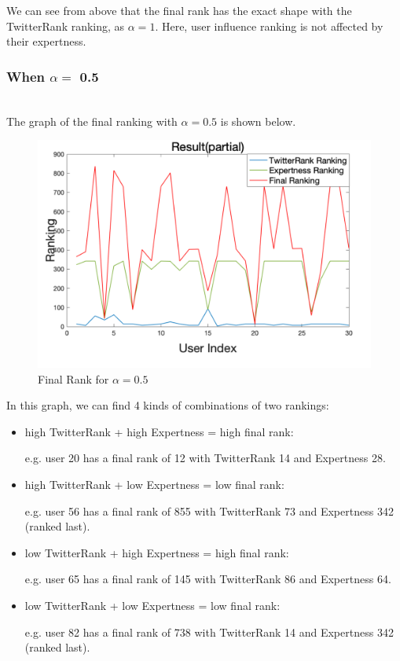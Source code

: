 \documentclass[conference]{IEEEtran}
\theoremstyle{definition}
\begin{document}
We can see from above that the final rank has the exact shape with the TwitterRank ranking, as $\alpha = 1$. Here, user influence ranking is not affected by their expertness.\\

\subsubsection{When $\alpha = $ 0.5}~\\
\indent The graph of the final ranking with $\alpha = 0.5$ is shown below.\par

\begin{figure}[htb]  
	\centering                       
	\includegraphics[width=0.8\linewidth]{5.png}
	\caption{Final Rank for $\alpha = 0.5$}
	\label{co05}
\end{figure} 

In this graph, we can find 4 kinds of combinations of two rankings: 

\begin{itemize}
	\item high TwitterRank + high Expertness = high final rank:\par
	e.g. user 20 has a final rank of 12 with TwitterRank 14 and Expertness 28.
	\item high TwitterRank + low Expertness = low final rank:\par
	e.g. user 56 has a final rank of 855 with TwitterRank 73 and Expertness 342 (ranked last).
	\item low TwitterRank + high Expertness = high final rank: \par
	e.g. user 65 has a final rank of 145 with TwitterRank 86 and Expertness 64.
	\item low TwitterRank + low Expertness = low final rank: \par
	e.g. user 82 has a final rank of 738 with TwitterRank 14 and Expertness 342 (ranked last).
\end{itemize}
\end{document}
